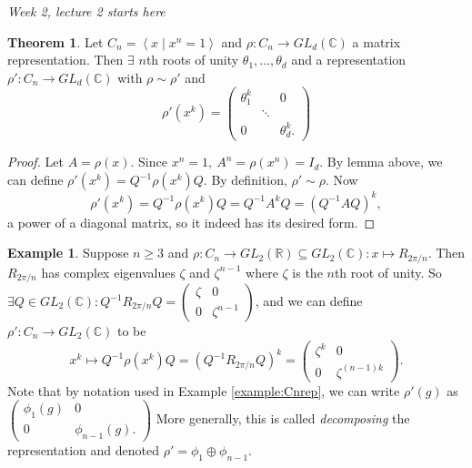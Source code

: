\documentclass{article}
\newcommand{\la}{\left\langle}
\newcommand{\ra}{\right\rangle}
\newcommand{\R}{\mathbb{R}}
\newcommand{\C}{\mathbb{C}}
\theoremstyle{definition}
\newtheorem{thm}[defn]{Theorem}
\newtheorem{example}[defn]{Example}
\begin{document}
\begin{flushright}
\textit{Week 2, lecture 2 starts here}
\end{flushright}

\begin{thm}
Let $C_n=\la x\mid x^n=1\ra$ and $\rho:C_n\rightarrow GL_d(\C)$ a matrix representation. Then $\exists$ $n$th roots of unity $\theta_1,\ldots,\theta_d$ and a representation $\rho':C_n\rightarrow GL_d(\C)$ with $\rho\sim\rho'$ and
\[
\rho'(x^k)=\begin{pmatrix}
\theta_1^k & & 0 \\ & \ddots \\ 0&&\theta_d^k.
\end{pmatrix}
\]
\end{thm}
\begin{proof}
Let $A=\rho(x)$. Since $x^n=1,\ A^n=\rho(x^n)=I_d$. By lemma above, we can define $\rho'(x^k)=Q^{-1}\rho(x^k)Q$. By definition, $\rho'\sim\rho$. Now
\[
\rho'(x^k)=Q^{-1}\rho(x^k)Q=Q^{-1}A^kQ=(Q^{-1}AQ)^k,
\]
a power of a diagonal matrix, so it indeed has its desired form.
\end{proof}

\begin{example}
Suppose $n\geq 3$ and $\rho:C_n\rightarrow GL_2(\R)\subseteq GL_2(\C):x\mapsto R_{2\pi/n}$. Then $R_{2\pi/n}$ has complex eigenvalues $\zeta$ and $\zeta^{n-1}$ where $\zeta$ is the $n$th root of unity. So $\exists Q\in GL_2(\C):Q^{-1}R_{2\pi/n}Q=\begin{pmatrix}
\zeta & 0 \\ 0 & \zeta^{n-1}
\end{pmatrix}$, and we can define $\rho':C_n\rightarrow GL_2(\C)$ to be
\[
x^k\mapsto Q^{-1}\rho(x^k) Q=(Q^{-1}R_{2\pi/n}Q)^k=\begin{pmatrix}
\zeta^k & 0 \\ 0 & \zeta^{(n-1)k}
\end{pmatrix}.
\]
Note that by notation used in Example \ref{example:Cnrep}, we can write $\rho'(g)$ as $\begin{pmatrix}
\phi_1(g) & 0 \\ 0 & \phi_{n-1}(g).
\end{pmatrix}$ More generally, this is called \textit{decomposing} the representation and denoted $\rho'=\phi_1\oplus\phi_{n-1}$.
\end{example}
\end{document}

